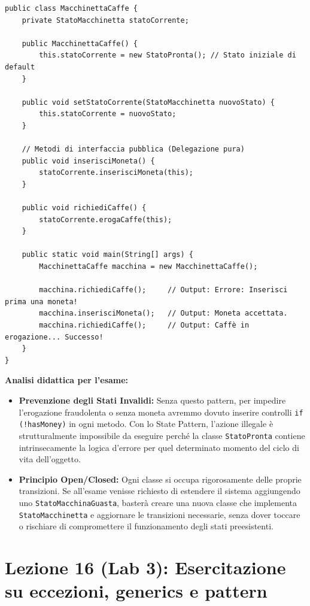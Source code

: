 \documentclass[12pt, a4paper]{article}
\begin{document}
\begin{verbatim}
public class MacchinettaCaffe {
    private StatoMacchinetta statoCorrente;

    public MacchinettaCaffe() {
        this.statoCorrente = new StatoPronta(); // Stato iniziale di default
    }

    public void setStatoCorrente(StatoMacchinetta nuovoStato) {
        this.statoCorrente = nuovoStato;
    }

    // Metodi di interfaccia pubblica (Delegazione pura)
    public void inserisciMoneta() {
        statoCorrente.inserisciMoneta(this);
    }

    public void richiediCaffe() {
        statoCorrente.erogaCaffe(this);
    }

    public static void main(String[] args) {
        MacchinettaCaffe macchina = new MacchinettaCaffe();

        macchina.richiediCaffe();     // Output: Errore: Inserisci prima una moneta!
        macchina.inserisciMoneta();   // Output: Moneta accettata.
        macchina.richiediCaffe();     // Output: Caffè in erogazione... Successo!
    }
}
\end{verbatim}

\textbf{Analisi didattica per l'esame:}
\begin{itemize}
    \item \textbf{Prevenzione degli Stati Invalidi:} Senza questo pattern, per impedire l'erogazione fraudolenta o senza moneta avremmo dovuto inserire controlli \texttt{if (!hasMoney)} in ogni metodo. Con lo State Pattern, l'azione illegale è strutturalmente impossibile da eseguire perché la classe \texttt{StatoPronta} contiene intrinsecamente la logica d'errore per quel determinato momento del ciclo di vita dell'oggetto.
    \item \textbf{Principio Open/Closed:} Ogni classe si occupa rigorosamente delle proprie transizioni. Se all'esame venisse richiesto di estendere il sistema aggiungendo uno \texttt{StatoMacchinaGuasta}, basterà creare una nuova classe che implementa \texttt{StatoMacchinetta} e aggiornare le transizioni necessarie, senza dover toccare o rischiare di compromettere il funzionamento degli stati preesistenti.
\end{itemize}

\section{Lezione 16 (Lab 3): Esercitazione su eccezioni, generics e pattern}
\end{document}
